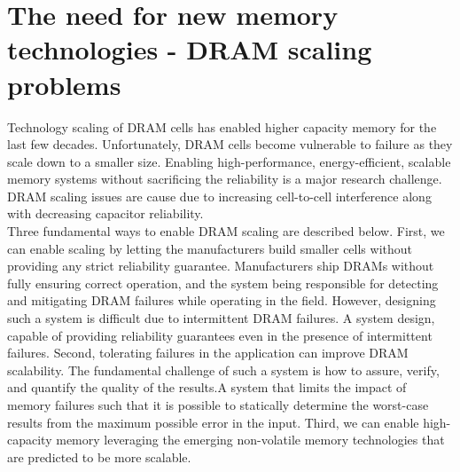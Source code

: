 \documentclass[11pt, conference, onecolumn]{IEEEtran}
\begin{document}
\section{The need for new memory technologies - DRAM scaling problems}
Technology scaling of DRAM cells has enabled higher capacity memory for the last few decades. Unfortunately, DRAM cells become vulnerable to failure as they scale down to a smaller size. Enabling high-performance, energy-efficient, scalable memory systems without sacrificing the reliability is a major research challenge.\\ DRAM scaling issues are cause due to increasing cell-to-cell interference along with decreasing capacitor reliability.
\\Three fundamental ways to enable DRAM scaling are described below. First, we can enable scaling by letting the manufacturers build smaller cells without providing any strict reliability guarantee. Manufacturers ship DRAMs without fully ensuring correct operation, and the system being responsible for detecting and mitigating DRAM failures while operating in the field. However, designing such a system is difficult due to intermittent DRAM failures. A system design, capable of providing reliability guarantees even in the presence of intermittent failures. Second, tolerating failures in the application can improve DRAM scalability. The fundamental challenge of such a system is how to assure, verify, and quantify the quality of the results.A system that limits the impact of memory failures such that it is possible to statically determine the worst-case results from the maximum possible error in the input. Third, we can enable high-capacity memory leveraging the emerging non-volatile memory technologies that are predicted to be more scalable.
\\
\\
\end{document}
